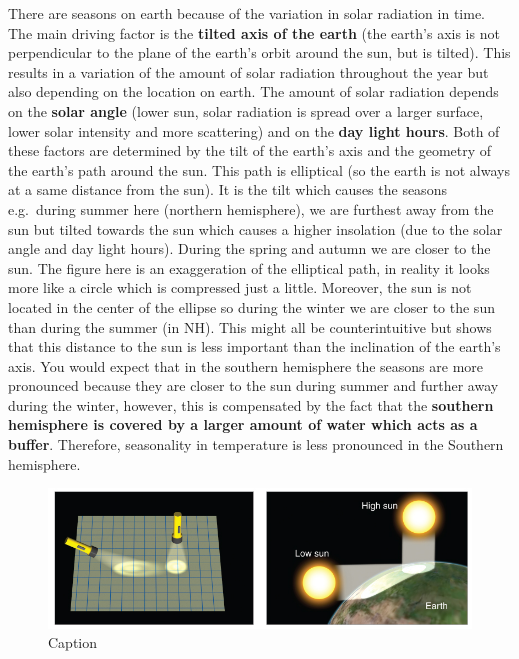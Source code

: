 \documentclass[12pt,oneside]{book}
\begin{document}
There are seasons on earth because of the variation in solar radiation
in time. The main driving factor is the \textbf{tilted axis of the
earth} (the earth's axis is not perpendicular to the plane of the
earth's orbit around the sun, but is tilted). This results in a
variation of the amount of solar radiation throughout the year but also
depending on the location on earth. The amount of solar radiation
depends on the \textbf{solar angle} (lower sun, solar radiation is
spread over a larger surface, lower solar intensity and more scattering)
and on the \textbf{day light hours}. Both of these factors are
determined by the tilt of the earth's axis and the geometry of the
earth's path around the sun. This path is elliptical (so the earth is
not always at a same distance from the sun). It is the tilt which causes
the seasons e.g.~during summer here (northern hemisphere), we are
furthest away from the sun but tilted towards the sun which causes a
higher insolation (due to the solar angle and day light hours). During
the spring and autumn we are closer to the sun. The figure here is an
exaggeration of the elliptical path, in reality it looks more like a
circle which is compressed just a little. Moreover, the sun is not
located in the center of the ellipse so during the winter we are closer
to the sun than during the summer (in NH). This might all be
counterintuitive but shows that this distance to the sun is less
important than the inclination of the earth's axis. You would expect
that in the southern hemisphere the seasons are more pronounced because
they are closer to the sun during summer and further away during the
winter, however, this is compensated by the fact that the
\textbf{southern hemisphere is covered by a larger amount of water which
acts as a buffer}. Therefore, seasonality in temperature is less
pronounced in the Southern hemisphere.

\begin{figure}

{\centering \includegraphics[width=1\linewidth]{figures/Figure21} 

}

\caption{Caption}\label{fig:Seasons}
\end{figure}
\end{document}
